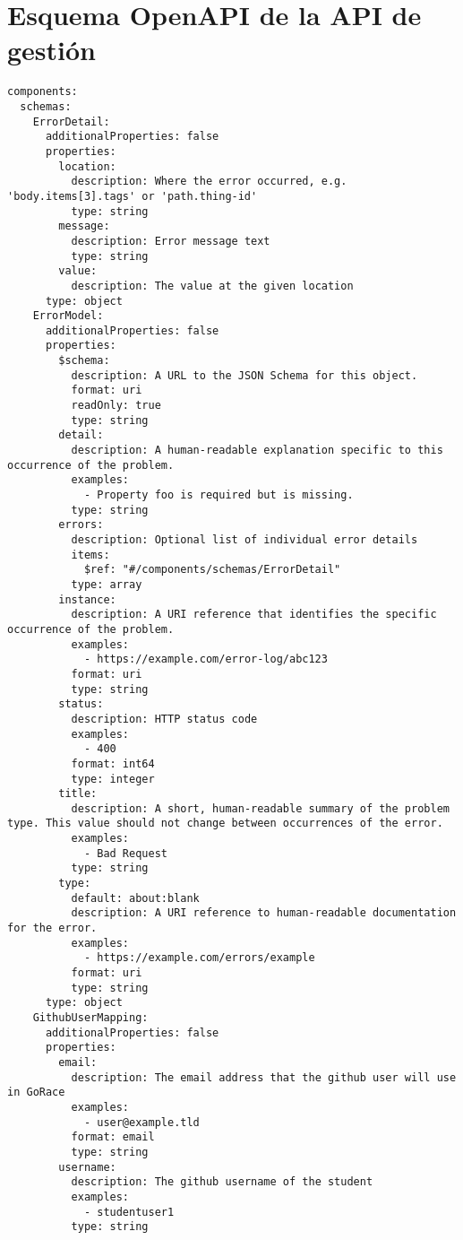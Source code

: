 \section{Esquema OpenAPI de la API de gestión} \label{openapi-schema}
\begin{verbatim}
components:
  schemas:
    ErrorDetail:
      additionalProperties: false
      properties:
        location:
          description: Where the error occurred, e.g. 'body.items[3].tags' or 'path.thing-id'
          type: string
        message:
          description: Error message text
          type: string
        value:
          description: The value at the given location
      type: object
    ErrorModel:
      additionalProperties: false
      properties:
        $schema:
          description: A URL to the JSON Schema for this object.
          format: uri
          readOnly: true
          type: string
        detail:
          description: A human-readable explanation specific to this occurrence of the problem.
          examples:
            - Property foo is required but is missing.
          type: string
        errors:
          description: Optional list of individual error details
          items:
            $ref: "#/components/schemas/ErrorDetail"
          type: array
        instance:
          description: A URI reference that identifies the specific occurrence of the problem.
          examples:
            - https://example.com/error-log/abc123
          format: uri
          type: string
        status:
          description: HTTP status code
          examples:
            - 400
          format: int64
          type: integer
        title:
          description: A short, human-readable summary of the problem type. This value should not change between occurrences of the error.
          examples:
            - Bad Request
          type: string
        type:
          default: about:blank
          description: A URI reference to human-readable documentation for the error.
          examples:
            - https://example.com/errors/example
          format: uri
          type: string
      type: object
    GithubUserMapping:
      additionalProperties: false
      properties:
        email:
          description: The email address that the github user will use in GoRace
          examples:
            - user@example.tld
          format: email
          type: string
        username:
          description: The github username of the student
          examples:
            - studentuser1
          type: string

\end{verbatim}
